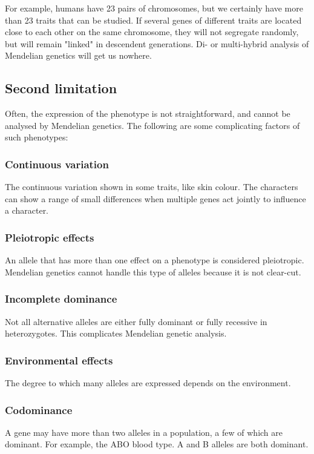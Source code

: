 \documentclass[11pt]{article}
\begin{document}
For example, humans have 23 pairs of chromosomes, but we certainly have more than 23 traits that can be studied. If several genes of different traits are located close to each other on the same chromosome, they will not segregate randomly, but will remain "linked" in descendent generations. Di- or multi-hybrid analysis of Mendelian genetics will get us nowhere.

\subsection{Second limitation}
\label{sec:orgec014d8}
Often, the expression of the phenotype is not straightforward, and cannot be analysed by Mendelian genetics. The following are some complicating factors of such phenotypes:

\subsubsection{Continuous variation}
\label{sec:org77612a2}
The continuous variation shown in some traits, like skin colour. The characters can show a range of small differences when multiple genes act jointly to influence a character.

\subsubsection{Pleiotropic effects}
\label{sec:org33090c2}
An allele that has more than one effect on a phenotype is considered pleiotropic. Mendelian genetics cannot handle this type of alleles because it is not clear-cut.

\subsubsection{Incomplete dominance}
\label{sec:org8d41b5e}
Not all alternative alleles are either fully dominant or fully recessive in heterozygotes. This complicates Mendelian genetic analysis.

\subsubsection{Environmental effects}
\label{sec:orgd005c43}
The degree to which many alleles are expressed depends on the environment.

\subsubsection{Codominance}
\label{sec:orgd4acd29}
A gene may have more than two alleles in a population, a few of which are dominant. For example, the ABO blood type. A and B alleles are both dominant.
\end{document}

